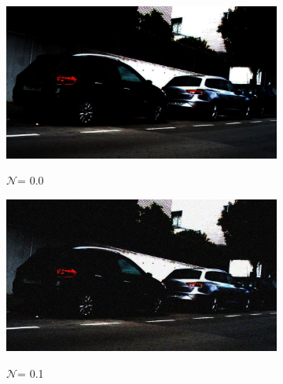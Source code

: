 \documentclass[a4paper]{ctexart}
\begin{document}
		\begin{figure}[htbp]
			\centering
			\begin{minipage}{0.01\textwidth}
				\captionsetup{font=scriptsize}
				\caption*{}
			\end{minipage}
			\begin{minipage}{0.98\textwidth}
			\begin{subfigure}{0.08\textwidth}
				\captionsetup{font=scriptsize}
				\caption*{$\mathcal{N}$= 0.0}
				\includegraphics[width=\linewidth]{picture/Edge Detection/degrade/RGB_001 Gamma=0.1, Gauss Noise=0.0}
				\label{fig: Gamma=0.1, Gauss Noise = 0.0}
			\end{subfigure}
			\begin{subfigure}{0.08\textwidth}
				\captionsetup{font=scriptsize}
				\caption*{$\mathcal{N}$= 0.1}
				\includegraphics[width=\linewidth]{picture/Edge Detection/degrade/RGB_001 Gamma=0.1, Gauss Noise=0.1}
				\label{fig：Gamma=0.1, Gauss Noise = 0.1}
			\end{subfigure}
			\begin{subfigure}{0.08\textwidth}
				\captionsetup{font=scriptsize}

\end{subfigure}
\end{minipage}
\end{figure}
\end{document}
